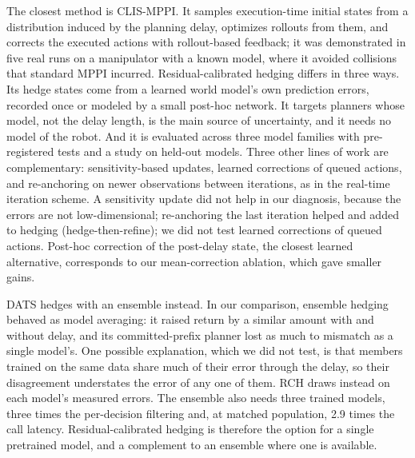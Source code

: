 \documentclass[aps,physrev,\manuscriptlayout,superscriptaddress,
  longbibliography,amsmath,amssymb]{revtex4-2}
\begin{document}
The closest method is CLIS-MPPI\cite{liu2026clis}. It samples execution-time initial states from a distribution induced by the planning delay, optimizes rollouts from them, and corrects the executed actions with rollout-based feedback; it was demonstrated in five real runs on a manipulator with a known model, where it avoided collisions that standard MPPI incurred. Residual-calibrated hedging differs in three ways. Its hedge states come from a learned world model's own prediction errors, recorded once or modeled by a small post-hoc network. It targets planners whose model, not the delay length, is the main source of uncertainty, and it needs no model of the robot. And it is evaluated across three model families with pre-registered tests and a study on held-out models. Three other lines of work are complementary: sensitivity-based updates\cite{zavala2009asnmpc,belvedere2026feedback}, learned corrections of queued actions\cite{lin2025speculative}, and re-anchoring on newer observations between iterations, as in the real-time iteration scheme\cite{diehl2005rti,melon2021receding}. A sensitivity update did not help in our diagnosis, because the errors are not low-dimensional; re-anchoring the last iteration helped and added to hedging (hedge-then-refine); we did not test learned corrections of queued actions. Post-hoc correction of the post-delay state\cite{jiang2026futurertc}, the closest learned alternative, corresponds to our mean-correction ablation, which gave smaller gains.

DATS\cite{chen2020dats} hedges with an ensemble instead. In our comparison, ensemble hedging behaved as model averaging: it raised return by a similar amount with and without delay, and its committed-prefix planner lost as much to mismatch as a single model's. One possible explanation, which we did not test, is that members trained on the same data share much of their error through the delay, so their disagreement understates the error of any one of them. RCH draws instead on each model's measured errors. The ensemble also needs three trained models, three times the per-decision filtering and, at matched population, 2.9 times the call latency. Residual-calibrated hedging is therefore the option for a single pretrained model, and a complement to an ensemble where one is available.
\end{document}
